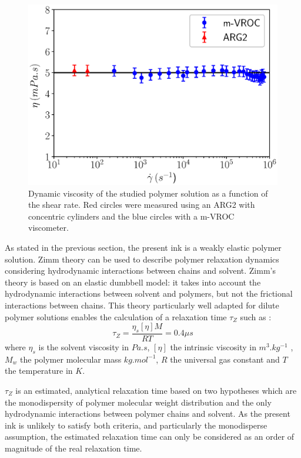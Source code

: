 \documentclass[onecolumn, 12pt]{asme2ej}
\begin{document}
\begin{figure}[H]
    \centering
    \includegraphics[width=15cm]{Figures/Fig4.eps}
    \caption{Dynamic viscosity of the studied polymer solution as a function of the shear rate. Red circles were measured using an ARG2 with concentric cylinders and the blue circles with a m-VROC viscometer.}
    \label{beahaviorLaw}
\end{figure}

As stated in the previous section, the present ink is a weakly elastic polymer solution. Zimm theory \cite{zimm1956dynamics} can be used to describe polymer relaxation dynamics considering hydrodynamic interactions between chains and solvent. Zimm's theory is based on an elastic dumbbell model: it takes into account the hydrodynamic interactions between solvent and polymers, but not the frictional interactions between chains.
This theory particularly well adapted for dilute polymer solutions enables the calculation of a relaxation time $\tau_Z$ such as :
\begin{equation}
    \tau_Z = \frac{\eta_s [\eta] M}{RT} = 0.4 \mu s
    \label{zimm} 
\end{equation}
where $\eta_s$ is the solvent viscosity in $Pa.s$, $[\eta]$ the intrinsic viscosity in $m^3.kg^{-1}$ , $M_w$ the polymer molecular mass $kg.mol^{-1}$, $R$ the universal gas constant and $T$ the temperature in $K$.

$\tau_Z$ is an estimated, analytical relaxation time based on two hypotheses which are the monodispersity of polymer molecular weight distribution and the only hydrodynamic interactions between polymer chains and solvent. As the present ink is unlikely to satisfy both criteria, and particularly the monodisperse assumption, the estimated relaxation time can only be considered as an order of magnitude of the real relaxation time.
\end{document}
